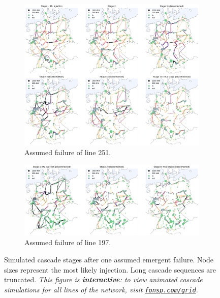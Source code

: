 \documentclass[main.tex]{subfiles}
\begin{document}
\begin{figure}[ht]
\renewcommand\figurename{Interactive Figure}
\begin{subfigure}{\textwidth}
    \centering
    \includegraphics[width=\textwidth]{img/master_with_cov_251.pdf}
    \caption{Assumed failure of line 251.}\label{ifig:master251}
\end{subfigure}
%
\begin{subfigure}{\textwidth}
    \centering
    \includegraphics[width=\textwidth]{img/master_with_cov_197.pdf}
    \caption{Assumed failure of line 197.}\label{ifig:master197}
\end{subfigure}
%
    \caption{Simulated cascade stages after one assumed emergent failure. Node sizes represent the most likely injection. Long cascade sequences are truncated.
\vspace{.5em}
\newline
\emph{This figure is \textbf{interactive}: to view animated cascade simulations for all lines of the network, visit \href{https://fonsp.com/grid}{\texttt{fonsp.com/grid}}.}
}\label{ifig:master}
\end{figure}
\end{document}
